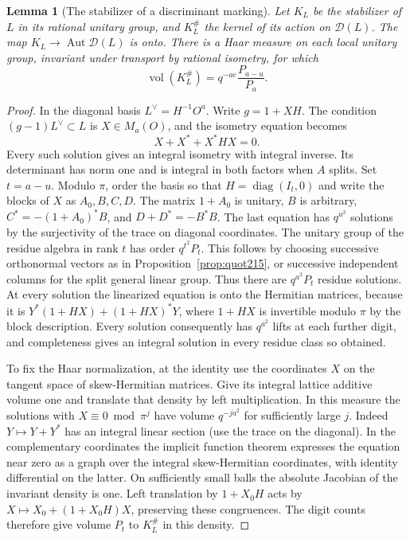\documentclass[a4paper,11pt]{article}
\newtheorem{lemma}[proposition]{Lemma}
\theoremstyle{definition}
\theoremstyle{remark}
\numberwithin{equation}{section}
\newcommand{\Aut}{\operatorname{Aut}}
\begin{document}
\begin{lemma}[The stabilizer of a discriminant marking]
\label{lem:discstab221}
Let \(K_L\) be the stabilizer of \(L\) in its rational unitary
group, and \(K_L^\#\) the kernel of its action on
\(\mathcal D(L)\). The map \(K_L\to\Aut\mathcal D(L)\)
is onto. There is a Haar measure on each local unitary group,
invariant under transport by rational isometry, for which
\begin{equation}
                 \operatorname{vol}(K_L^\#)
                       =q^{-ae}\frac{P_{a-u}}{P_a}.
                       \label{eq:discvol221}
\end{equation}
\end{lemma}
\begin{proof}
In the diagonal basis \(L^\vee=H^{-1}O^a\). Write
\(g=1+XH\). The condition \((g-1)L^\vee\subset L\) is
\(X\in M_a(O)\), and the isometry equation becomes
\[
                      X+X^*+X^*HX=0 .
\]
Every such solution gives an integral isometry with integral
inverse. Its determinant has norm one and is integral in
both factors when \(A\) splits. Set \(t=a-u\). Modulo
\(\pi\), order the basis so that \(H=\operatorname{diag}(I_t,0)\)
and write the blocks of \(X\) as \(A_0,B,C,D\). The matrix
\(1+A_0\) is unitary, \(B\) is arbitrary,
\(C^*=-(1+A_0)^*B\), and \(D+D^*=-B^*B\).
The last equation has \(q^{u^2}\) solutions by the surjectivity
of the trace on diagonal coordinates. The unitary group of the
residue algebra in rank \(t\) has order \(q^{t^2}P_t\).
This follows by choosing successive orthonormal vectors as in
Proposition~\ref{prop:quot215}, or successive independent
columns for the split general linear group. Thus there are
\(q^{a^2}P_t\) residue solutions. At every solution the
linearized equation is onto the Hermitian matrices, because
it is \(Y^*(1+HX)+(1+HX)^*Y\), where \(1+HX\) is
invertible modulo \(\pi\) by the block description. Every
solution consequently has \(q^{a^2}\) lifts at each further
digit, and completeness gives an integral solution in every
residue class so obtained.

To fix the Haar normalization, at the identity use the
coordinates \(X\) on the tangent space of skew-Hermitian
matrices. Give its integral lattice additive volume one and
translate that density by left multiplication. In this
measure the solutions with \(X\equiv0\bmod\pi^j\) have volume
\(q^{-ja^2}\) for sufficiently large \(j\). Indeed
\(Y\mapsto Y+Y^*\) has an integral linear section (use the
trace on the diagonal). In the complementary coordinates the
implicit function theorem expresses the equation near zero
as a graph over the integral skew-Hermitian coordinates, with
identity differential on the latter. On sufficiently small
balls the absolute Jacobian of the invariant density is one.
Left translation by \(1+X_0H\) acts by
\(X\mapsto X_0+(1+X_0H)X\), preserving these congruences.
The digit counts therefore give volume \(P_t\) to \(K_L^\#\)
in this density.


\end{proof}
\end{document}
